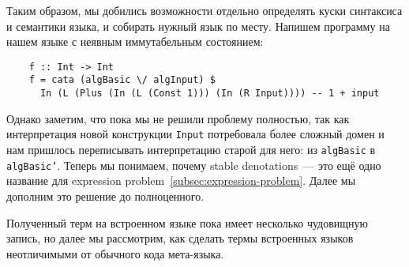 Таким образом, мы добились возможности отдельно определять куски синтаксиса и семантики языка, и собирать нужный язык по месту.
Напишем программу на нашем языке с неявным иммутабельным состоянием:
\begin{verbatim}
    f :: Int -> Int
    f = cata (algBasic \/ algInput) $
      In (L (Plus (In (L (Const 1))) (In (R Input)))) -- 1 + input
\end{verbatim}

Однако заметим, что пока мы не решили проблему полностью, так как интерпретация новой конструкции \texttt{Input} потребовала более сложный домен и нам пришлось переписывать интерпретацию старой для него: из \texttt{algBasic} в \texttt{algBasic'}.
Теперь мы понимаем, почему stable denotations~--- это ещё одно название для expression problem~\ref{subsec:expression-problem}.
Далее мы дополним это решение до полноценного. %

Полученный терм на встроенном языке пока имеет несколько чудовищную запись, но далее мы рассмотрим, как сделать термы встроенных языков неотличимыми от обычного кода мета-языка.
